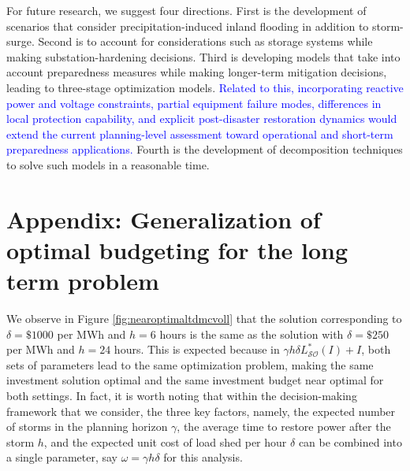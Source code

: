 \documentclass[authoryear,preprint,review,12pt]{elsarticle}\usepackage{amssymb}
\begin{document}
For future research, we suggest four directions. First is the development of scenarios that consider precipitation-induced inland flooding in addition to storm-surge. Second is to account for considerations such as storage systems while making substation-hardening decisions. Third is developing models that take into account preparedness measures while making longer-term mitigation decisions, leading to three-stage optimization models. \textcolor{blue}{Related to this, incorporating reactive power and voltage constraints, partial equipment failure modes, differences in local protection capability, and explicit post-disaster restoration dynamics would extend the current planning-level assessment toward operational and short-term preparedness applications.} Fourth is the development of decomposition techniques to solve such models in a reasonable time. 





\singlespacing
 


\section*{Appendix: Generalization of optimal budgeting for the long term problem} \label{optimalbudget}

We observe in Figure \ref{fig:nearoptimaltdmcvoll} that the solution corresponding to $\delta=\$1000$ per MWh and $h=6$ hours is the same as the solution with $\delta=\$250$ per MWh and $h=24$ hours. This is expected because in $\gamma h \delta L_\mathcal{SO}^*(I)+I$, both sets of parameters lead to the same optimization problem, making the same investment solution optimal and the same investment budget near optimal for both settings. In fact, it is worth noting that within the decision-making framework that we consider, the three key factors, namely, the expected number of storms in the planning horizon $\gamma$, the average time to restore power after the storm $h$, and the expected unit cost of load shed per hour $\delta$ can be combined into a single parameter, say $\omega = \gamma h \delta$ for this analysis.
\end{document}
